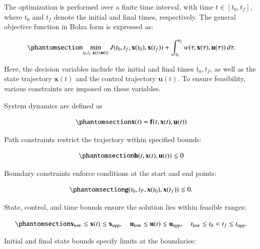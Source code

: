 \documentclass[
  number,
  preprint]{elsarticle}
\begin{document}
The optimization is performed over a finite time interval, with time
\(t \in [t_0, t_f]\), where \(t_0\) and \(t_f\) denote the initial and
final times, respectively. The general objective function in Bolza form
is expressed as:

\begin{equation}\protect\phantomsection\label{eq-bolza}{
\min_{t_0, t_f, \mathbf{x}(t), \mathbf{u}(t)} J(t_0, t_f, \mathbf{x}(t_0), \mathbf{x}(t_f)) + \int_{t_0}^{t_f} w(\tau, \mathbf{x}(\tau), \mathbf{u}(\tau)) \, d\tau.
}\end{equation}

Here, the decision variables include the initial and final times
\(t_0, t_f\), as well as the state trajectory \(\mathbf{x}(t)\) and the
control trajectory \(\mathbf{u}(t)\). To ensure feasibility, various
constraints are imposed on these variables.

System dynamics are defined as

\begin{equation}\protect\phantomsection\label{eq-dynamics}{
\dot{\mathbf{x}}(t) = \mathbf{f}(t, \mathbf{x}(t), \mathbf{u}(t))
}\end{equation}

Path constraints restrict the trajectory within specified bounds:

\begin{equation}\protect\phantomsection\label{eq-path-constraints}{
\mathbf{h}(t, \mathbf{x}(t), \mathbf{u}(t)) \leq 0
}\end{equation}

Boundary constraints enforce conditions at the start and end points:

\begin{equation}\protect\phantomsection\label{eq-boundary-constraints}{
\mathbf{g}(t_0, t_F, \mathbf{x}(t_0), \mathbf{x}(t_f)) \leq 0.
}\end{equation}

State, control, and time bounds ensure the solution lies within feasible
ranges:

\begin{equation}\protect\phantomsection\label{eq-bounds}{
\mathbf{x}_\text{low} \leq \mathbf{x}(t) \leq \mathbf{x}_\text{upp}, \quad 
\mathbf{u}_\text{low} \leq \mathbf{u}(t) \leq \mathbf{u}_\text{upp}, \quad 
t_\text{low} \leq t_0 < t_f \leq t_\text{upp}.
}\end{equation}

Initial and final state bounds specify limits at the boundaries:
\end{document}
